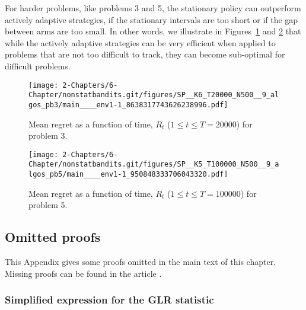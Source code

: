 For harder problems, like problems 3 and 5, the stationary policy \klUCB{} can outperform actively adaptive strategies, if the stationary intervals are too short or if the gap between arms are too small.
In other words, we illustrate in Figures~\ref{fig:6:meanRegretPb3} and \ref{fig:6:meanRegretPb5} that while the actively adaptive strategies can be very efficient when applied to problems that are not too difficult to track, they can become sub-optimal for difficult problems.

\begin{figure}[h!]  %
    \centering
    \texttt{[image: 2-Chapters/6-Chapter/nonstatbandits.git/figures/SP\_\_K6\_T20000\_N500\_\_9\_algos\_pb3/main\_\_\_\_env1-1\_8638317743626238996.pdf]}
    \caption{Mean regret as a function of time, $R_t$ ($1 \leq t \leq T = 20000$) for problem 3.}
    \label{fig:6:meanRegretPb3}
\end{figure}


\begin{figure}[h!]  %
    \centering
    \texttt{[image: 2-Chapters/6-Chapter/nonstatbandits.git/figures/SP\_\_K5\_T100000\_N500\_\_9\_algos\_pb5/main\_\_\_\_env1-1\_950848333706043320.pdf]}
    \caption{Mean regret as a function of time, $R_t$ ($1 \leq t \leq T = 100000$) for problem 5.}
    \label{fig:6:meanRegretPb5}
\end{figure}


\subsection{Omitted proofs}\label{proof:6:Conc}

This Appendix gives some proofs omitted in the main text of this chapter.
Missing proofs can be found in the article \cite{Besson2019GLRT}.


\subsubsection{Simplified expression for the GLR statistic}\label{app:6:GLR_with_kl}



